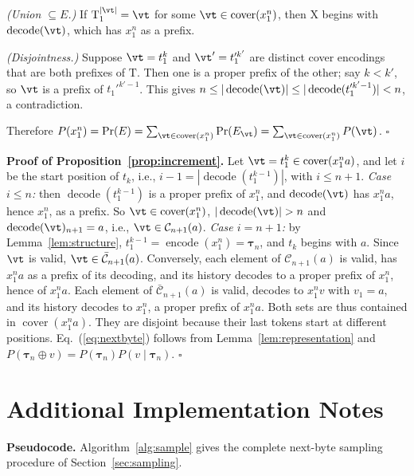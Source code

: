 \documentclass{article} %
\newcommand{\enc}{\operatorname{encode}}
\newcommand{\dec}{\operatorname{decode}}
\newcommand{\cover}{\operatorname{cover}}
\providecommand{\rX}{\mathrm{X}}
\providecommand{\rT}{\mathrm{T}}
\providecommand{\vtau}{\boldsymbol{\tau}}
\begin{document}
\emph{(Union $\subseteq E$.)} If $\rT_1^{|\vt|} = \vt$ for some $\vt \in \cover(x_1^n)$, then $\rX$ begins with $\dec(\vt)$, which has $x_1^n$ as a prefix.

\emph{(Disjointness.)} Suppose $\vt = t_1^k$ and $\vt' = t_1'^{k'}$ are distinct cover encodings that are both prefixes of $\rT$. Then one is a proper prefix of the other; say $k < k'$, so $\vt$ is a prefix of $t_1'^{k'-1}$. This gives $n \le |\dec(\vt)| \le |\dec(t_1'^{k'-1})| < n$, a contradiction.

Therefore $P(x_1^n) = \Pr(E) = \sum_{\vt\in\cover(x_1^n)} \Pr(E_{\vt}) = \sum_{\vt\in\cover(x_1^n)} P(\vt)$. \hfill$\square$

\textbf{Proof of Proposition~\ref{prop:increment}.}
Let $\vt = t_1^k \in \cover(x_1^n a)$, and let $i$ be the start position of $t_k$, i.e., $i-1 = |\dec(t_1^{k-1})|$, with $i \le n+1$.
\emph{Case $i \le n$:} then $\dec(t_1^{k-1})$ is a proper prefix of $x_1^n$, and $\dec(\vt)$ has $x_1^n a$, hence $x_1^n$, as a prefix. So $\vt \in \cover(x_1^n)$, $|\dec(\vt)| > n$ and $\dec(\vt)_{n+1}=a$, i.e., $\vt\in\mathcal{C}_{n+1}(a)$.
\emph{Case $i = n+1$:} by Lemma~\ref{lem:structure}, $t_1^{k-1} = \enc(x_1^n) = \vtau_n$, and $t_k$ begins with $a$. Since $\vt$ is valid, $\vt \in \bar{\mathcal{C}}_{n+1}(a)$.
Conversely, each element of $\mathcal{C}_{n+1}(a)$ is valid, has $x_1^n a$ as a prefix of its decoding, and its history decodes to a proper prefix of $x_1^n$, hence of $x_1^n a$. Each element of $\bar{\mathcal{C}}_{n+1}(a)$ is valid, decodes to $x_1^n v$ with $v_1 = a$, and its history decodes to $x_1^n$, a proper prefix of $x_1^n a$. Both sets are thus contained in $\cover(x_1^n a)$. They are disjoint because their last tokens start at different positions. Eq.~(\ref{eq:nextbyte}) follows from Lemma~\ref{lem:representation} and $P(\vtau_n\oplus v) = P(\vtau_n)P(v\mid\vtau_n)$. \hfill$\square$

\section{Additional Implementation Notes}
\label{app:impl}

\textbf{Pseudocode.} Algorithm~\ref{alg:sample} gives the complete next-byte sampling procedure of Section~\ref{sec:sampling}.
\end{document}
